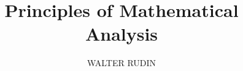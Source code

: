 \documentclass{amsbook}
\theoremstyle{definition}
\theoremstyle{remark}
\numberwithin{section}{chapter}
\numberwithin{equation}{chapter}
\begin{document}
% 
\frontmatter
\title{Principles of Mathematical Analysis}

\author{WALTER RUDIN}
\address{Professor of Mathematics, University of Wisconsin--Madison}



\maketitle

\setcounter{page}{7}
\tableofcontents



\mainmatter













\printunsrtglossary[type=symbols,style=long,title=List of Special Symbols]
\backmatter


\end{document}
